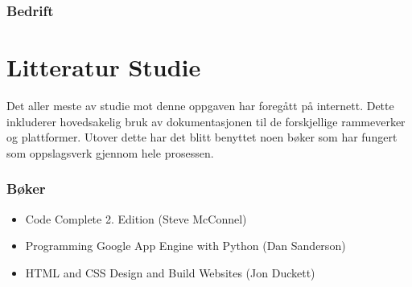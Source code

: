 \subsubsection{Bedrift}


\section{Litteratur Studie}
Det aller meste av studie mot denne oppgaven har foregått på internett. Dette inkluderer hovedsakelig bruk av dokumentasjonen til de forskjellige rammeverker og plattformer. Utover dette har det blitt benyttet noen bøker som har fungert som oppslagsverk gjennom hele prosessen.

\subsubsection*{Bøker}
\begin{itemize}
\item Code Complete 2. Edition (Steve McConnel)
\item Programming Google App Engine with Python (Dan Sanderson)
\item HTML and CSS Design and Build Websites (Jon Duckett)
\end{itemize}
\newpage